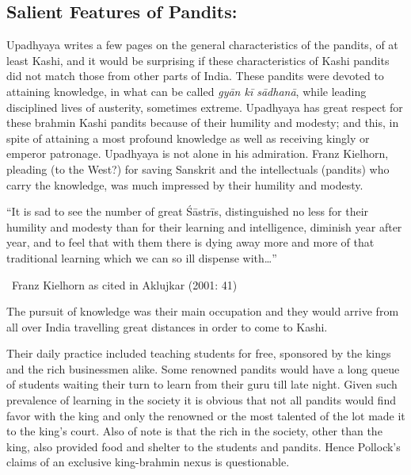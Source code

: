 \subsection*{Salient Features of Pandits:}

Upadhyaya writes a few pages on the general characteristics of the pandits, of at least Kashi, and it would be surprising if these characteristics of Kashi pandits did not match those from other parts of India. These pandits were devoted to attaining knowledge, in what can be called \textit{gyān kī sādhanā}, while leading disciplined lives of austerity, sometimes extreme. Upadhyaya has great respect for these brahmin Kashi pandits because of their humility and modesty; and this, in spite of attaining a most profound knowledge as well as receiving kingly or emperor patronage. Upadhyaya is not alone in his admiration. Franz Kielhorn, pleading (to the West?) for saving Sanskrit and the intellectuals (pandits) who carry the knowledge, was much impressed by their humility and modesty.

\begin{myquote}
“It is sad to see the number of great Śāstrīs, distinguished no less for their humility and modesty than for their learning and intelligence, diminish year after year, and to feel that with them there is dying away more and more of that traditional learning which we can so ill dispense with…” 

~\hfill Franz Kielhorn as cited in Aklujkar (2001: 41)
\end{myquote}

The pursuit of knowledge was their main occupation and they would arrive from all over India travelling great distances in order to come to Kashi.

Their daily practice included teaching students for free, sponsored by the kings and the rich businessmen alike. Some renowned pandits would have a long queue of students waiting their turn to learn from their guru till late night. Given such prevalence of learning in the society it is obvious that not all pandits would find favor with the king and only the renowned or the most talented of the lot made it to the king’s court. Also of note is that the rich in the society, other than the king, also provided food and shelter to the students and pandits. Hence Pollock’s claims of an exclusive king-brahmin nexus is questionable.

\newpage

